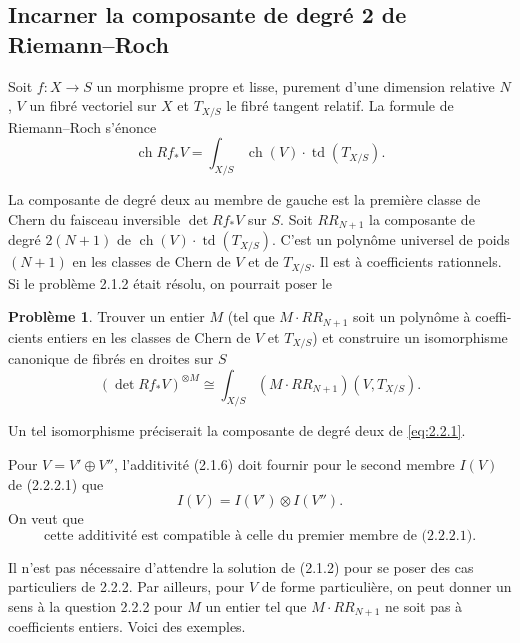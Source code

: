 \documentclass[12pt,a4paper]{article}
\theoremstyle{plain}
\theoremstyle{definition}
\newtheorem{probleme}[theorem]{Probl\`eme}
\DeclareMathOperator{\ch}{ch}
\DeclareMathOperator{\td}{td}
\begin{document}
\subsection{Incarner la composante de degr\'e 2 de Riemann--Roch}

Soit $f: X \to S$ un morphisme propre et lisse, purement d'une dimension
relative $N$, $V$ un fibr\'e vectoriel sur $X$ et $T_{X/S}$ le fibr\'e tangent relatif.
La formule de Riemann--Roch s'\'enonce
\begin{equation}\label{eq:2.2.1}
\ch Rf_* V = \int_{X/S} \ch(V) \cdot \td(T_{X/S}) .
\end{equation}

La composante de degr\'e deux au membre de gauche est la premi\`ere classe de
Chern du faisceau inversible $\det Rf_* V$ sur $S$. Soit $RR_{N+1}$ la composante
de degr\'e $2(N+1)$ de $\ch(V) \cdot \td(T_{X/S})$. C'est un polyn\^ome universel de poids
$(N+1)$ en les classes de Chern de $V$ et de $T_{X/S}$. Il est \`a coefficients
rationnels. Si le probl\`eme 2.1.2 \'etait r\'esolu, on pourrait poser le

\begin{probleme}
Trouver un entier $M$ (tel que $M \cdot RR_{N+1}$ soit un polyn\^ome \`a coeffi-
cients entiers en les classes de Chern de $V$ et $T_{X/S}$) et construire un isomorphisme
canonique de fibr\'es en droites sur $S$
\begin{equation}\label{eq:2.2.2.1}
(\det Rf_* V)^{\otimes M} \cong \textstyle \int_{X/S} (M \cdot RR_{N+1})(V, T_{X/S}) .
\end{equation}
\end{probleme}

Un tel isomorphisme pr\'eciserait la composante de degr\'e deux de \eqref{eq:2.2.1}.

Pour $V = V' \oplus V''$, l'additivit\'e (2.1.6) doit fournir pour le second membre
$I(V)$ de (2.2.2.1) que
\[
I(V) = I(V') \otimes I(V'') .
\]
On veut que
\begin{equation}\label{eq:2.2.3}
\text{cette additivit\'e est compatible \`a celle du premier membre de (2.2.2.1).}
\end{equation}

Il n'est pas n\'ecessaire d'attendre la solution de (2.1.2) pour se poser des
cas particuliers de 2.2.2. Par ailleurs, pour $V$ de forme particuli\`ere, on peut
donner un sens \`a la question 2.2.2 pour $M$ un entier tel que $M \cdot RR_{N+1}$ ne soit
pas \`a coefficients entiers. Voici des exemples.

\subsubsection{}
\end{document}

